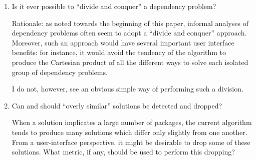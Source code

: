 \documentclass[letterpaper]{article}
\theoremstyle{definition}
\theoremstyle{remark}
\begin{document}
\begin{enumerate}
\item Is it ever possible to ``divide and conquer'' a dependency
  problem?

  Rationale: as noted towards the beginning of this paper, informal
  analyses of dependency problems often seem to adopt a ``divide and
  conquer'' approach.  Moreover, such an approach would have several
  important user interface benefits: for instance, it would avoid the
  tendency of the algorithm to produce the Cartesian product of all
  the different ways to solve each isolated group of dependency
  problems.

  I do not, however, see an obvious simple way of performing such a
  division.

\item Can and should ``overly similar'' solutions be detected and
  dropped?

  When a solution implicates a large number of packages, the current
  algorithm tends to produce many solutions which differ only slightly
  from one another.  From a user-interface perspective, it might be
  desirable to drop some of these solutions.  What metric, if any,
  should be used to perform this dropping?
\end{enumerate}
\end{document}
